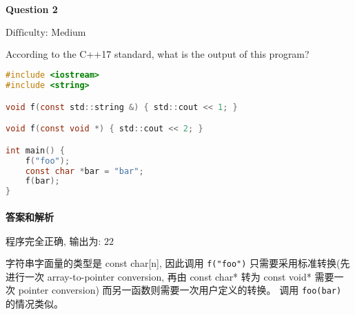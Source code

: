 \documentclass{article}
\begin{document}
	\paragraph*{Question 2} $\boxed{\text{Difficulty: Medium}} $			
	
	According to the C++17 standard, what is the output of this program?
	
	\begin{lstlisting}[language=C]  		
#include <iostream>
#include <string>

void f(const std::string &) { std::cout << 1; }

void f(const void *) { std::cout << 2; }

int main() {
	f("foo");
	const char *bar = "bar";
	f(bar);
}
	\end{lstlisting}
	
	
	\paragraph*{答案和解析} $\boxed{\text{程序完全正确, 输出为: 22}} $
	
	字符串字面量的类型是 const char[n], 因此调用 \verb|f("foo")| 只需要采用标准转换(先进行一次 array-to-pointer conversion, 再由 const char* 转为 const void* 需要一次 pointer conversion) 而另一函数则需要一次用户定义的转换。
	调用 \verb|foo(bar)| 的情况类似。 
\end{document}
